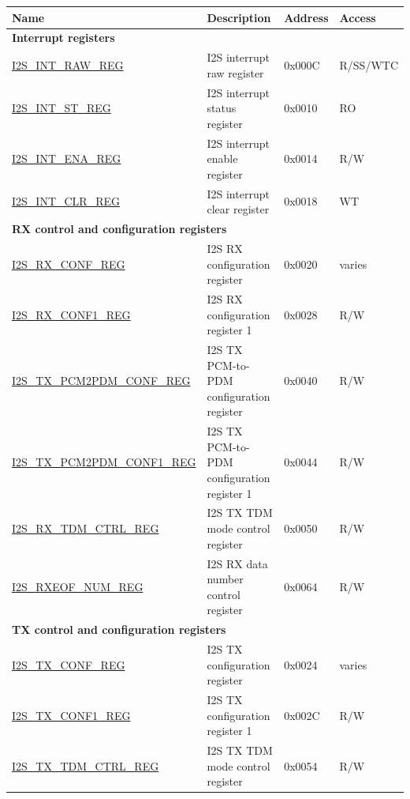 \begin{longtable}{ | p{5cm} | p{7.2cm} | p{1.3cm} | p{2cm} | }
\hline\rowcolor{lightgray}
\textbf{Name} & \textbf{Description} &  \textbf{Address} & \textbf{Access} \\ \hline
\endhead
\multicolumn{4}{|l|}{\textbf{Interrupt registers}} \\ \hline
\hyperref[regdesc:I2SINTRAWREG]{I2S\_INT\_RAW\_REG} & I2S interrupt raw register  & 0x000C & R/SS/WTC \\ \hline
\hyperref[regdesc:I2SINTSTREG]{I2S\_INT\_ST\_REG} & I2S interrupt status register & 0x0010 & RO \\ \hline
\hyperref[regdesc:I2SINTENAREG]{I2S\_INT\_ENA\_REG} & I2S interrupt enable register & 0x0014 & R/W \\ \hline
\hyperref[regdesc:I2SINTCLRREG]{I2S\_INT\_CLR\_REG} & I2S interrupt clear register & 0x0018 & WT \\ \hline
\multicolumn{4}{|l|}{\textbf{RX control and configuration registers}} \\ \hline
\hyperref[regdesc:I2SRXCONFREG]{I2S\_RX\_CONF\_REG} & I2S RX configuration register & 0x0020 & varies \\ \hline
\hyperref[regdesc:I2SRXCONF1REG]{I2S\_RX\_CONF1\_REG} & I2S RX configuration register 1 & 0x0028 & R/W \\ \hline
\hyperref[regdesc:I2STXPCM2PDMCONFREG]{I2S\_TX\_PCM2PDM\_CONF\_REG} & I2S TX PCM-to-PDM configuration register & 0x0040 & R/W \\ \hline
\hyperref[regdesc:I2STXPCM2PDMCONF1REG]{I2S\_TX\_PCM2PDM\_CONF1\_REG} & I2S TX PCM-to-PDM configuration register 1 & 0x0044 & R/W \\ \hline
\hyperref[regdesc:I2SRXTDMCTRLREG]{I2S\_RX\_TDM\_CTRL\_REG} & I2S TX TDM mode control register & 0x0050 & R/W \\ \hline
\hyperref[regdesc:I2SRXEOFNUMREG]{I2S\_RXEOF\_NUM\_REG} & I2S RX data number control register & 0x0064 & R/W \\ \hline
\multicolumn{4}{|l|}{\textbf{TX control and configuration registers}} \\ \hline
\hyperref[regdesc:I2STXCONFREG]{I2S\_TX\_CONF\_REG} & I2S TX configuration register & 0x0024 & varies \\ \hline
\hyperref[regdesc:I2STXCONF1REG]{I2S\_TX\_CONF1\_REG} & I2S TX configuration register 1 & 0x002C & R/W \\ \hline
\hyperref[regdesc:I2STXTDMCTRLREG]{I2S\_TX\_TDM\_CTRL\_REG} & I2S TX TDM mode control register & 0x0054 & R/W \\ \hline

\end{longtable}
